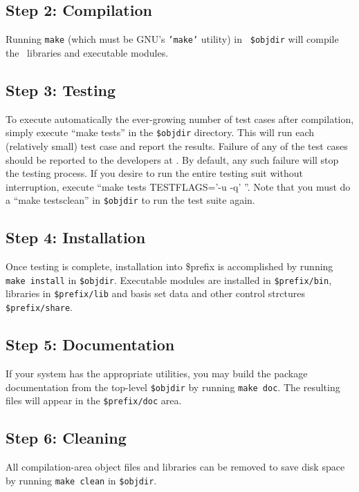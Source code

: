 \documentclass[12pt]{article}
\begin{document}
\subsection{Step 2: Compilation}

Running {\tt make} (which must be GNU's {\tt 'make'} utility) in {\tt
\$objdir} will compile the \PSIfour\ libraries and executable
modules.

\subsection{Step 3: Testing}

To execute automatically the ever-growing number of test cases after
compilation, simply execute ``make tests'' in the {\tt \$objdir}
directory.  This will run each (relatively small) test case and report
the results.  Failure of any of the test cases should be reported to
the developers at \PSIemail. By default, any such failure will stop
the testing process.  If you desire to run the entire testing suit
without interruption, execute ``make tests TESTFLAGS='-u -q' ''. Note
that you must do a ``make testsclean'' in {\tt \$objdir} to run the test
suite again.

\subsection{Step 4: Installation}

Once testing is complete, installation into \$prefix is accomplished by
running {\tt make install} in {\tt \$objdir}.   Executable modules are
installed in {\tt \$prefix/bin}, libraries in {\tt \$prefix/lib} and basis 
set data and other control strctures {\tt \$prefix/share}.

\subsection{Step 5: Documentation}

If your system has the appropriate utilities, you may build the package
documentation from the top-level {\tt \$objdir} by running {\tt make doc}.  
The resulting files will appear in the {\tt \$prefix/doc} area.

\subsection{Step 6: Cleaning}

All compilation-area object files and libraries can be removed to save
disk space by running {\tt make clean} in {\tt \$objdir}.
\end{document}
